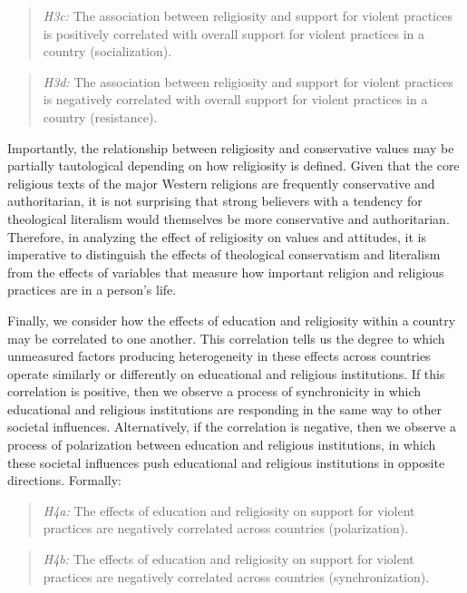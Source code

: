 \documentclass[10pt,letterpaper]{article}
\begin{document}
\begin{quote}
\emph{H3c:} The association between religiosity and support for violent practices is positively correlated with overall support for violent practices in a country (socialization).
\end{quote}

\begin{quote}
\emph{H3d:} The association between religiosity and support for violent practices is negatively correlated with overall support for violent practices in a country (resistance).
\end{quote}

Importantly, the relationship between religiosity and conservative values may be partially tautological depending on how religiosity is defined. Given that the core religious texts of the major Western religions are frequently conservative and authoritarian, it is not surprising that strong believers with a tendency for theological literalism would themselves be more conservative and authoritarian. Therefore, in analyzing the effect of religiosity on values and attitudes, it is imperative to distinguish the effects of theological conservatism and literalism from the effects of variables that measure how important religion and religious practices are in a person's life.

Finally, we consider how the effects of education and religiosity within a country may be correlated to one another. This correlation tells us the degree to which unmeasured factors producing heterogeneity in these effects across countries operate similarly or differently on educational and religious institutions. If this correlation is positive, then we observe a process of synchronicity in which educational and religious institutions are responding in the same way to other societal influences. Alternatively, if the correlation is negative, then we observe a process of polarization between education and religious institutions, in which these societal influences push educational and religious institutions in opposite directions. Formally:

\begin{quote}
\emph{H4a:} The effects of education and religiosity on support for violent practices are negatively correlated across countries (polarization).
\end{quote}

\begin{quote}
\emph{H4b:} The effects of education and religiosity on support for violent practices are negatively correlated across countries (synchronization).
\end{quote}
\end{document}

